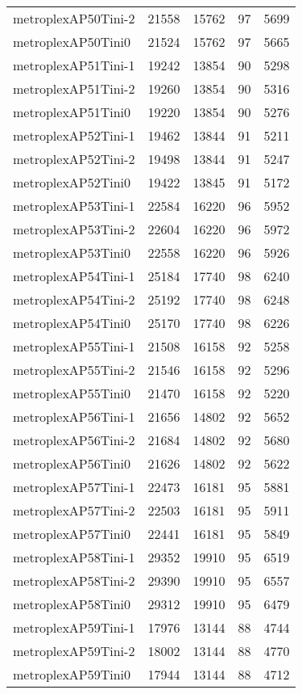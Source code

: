 \begin{longtable}{lrrrr}
metroplexAP50Tini-2 & 21558 & 15762 & 97 & 5699 \\
metroplexAP50Tini0 & 21524 & 15762 & 97 & 5665 \\
metroplexAP51Tini-1 & 19242 & 13854 & 90 & 5298 \\
metroplexAP51Tini-2 & 19260 & 13854 & 90 & 5316 \\
metroplexAP51Tini0 & 19220 & 13854 & 90 & 5276 \\
metroplexAP52Tini-1 & 19462 & 13844 & 91 & 5211 \\
metroplexAP52Tini-2 & 19498 & 13844 & 91 & 5247 \\
metroplexAP52Tini0 & 19422 & 13845 & 91 & 5172 \\
metroplexAP53Tini-1 & 22584 & 16220 & 96 & 5952 \\
metroplexAP53Tini-2 & 22604 & 16220 & 96 & 5972 \\
metroplexAP53Tini0 & 22558 & 16220 & 96 & 5926 \\
metroplexAP54Tini-1 & 25184 & 17740 & 98 & 6240 \\
metroplexAP54Tini-2 & 25192 & 17740 & 98 & 6248 \\
metroplexAP54Tini0 & 25170 & 17740 & 98 & 6226 \\
metroplexAP55Tini-1 & 21508 & 16158 & 92 & 5258 \\
metroplexAP55Tini-2 & 21546 & 16158 & 92 & 5296 \\
metroplexAP55Tini0 & 21470 & 16158 & 92 & 5220 \\
metroplexAP56Tini-1 & 21656 & 14802 & 92 & 5652 \\
metroplexAP56Tini-2 & 21684 & 14802 & 92 & 5680 \\
metroplexAP56Tini0 & 21626 & 14802 & 92 & 5622 \\
metroplexAP57Tini-1 & 22473 & 16181 & 95 & 5881 \\
metroplexAP57Tini-2 & 22503 & 16181 & 95 & 5911 \\
metroplexAP57Tini0 & 22441 & 16181 & 95 & 5849 \\
metroplexAP58Tini-1 & 29352 & 19910 & 95 & 6519 \\
metroplexAP58Tini-2 & 29390 & 19910 & 95 & 6557 \\
metroplexAP58Tini0 & 29312 & 19910 & 95 & 6479 \\
metroplexAP59Tini-1 & 17976 & 13144 & 88 & 4744 \\
metroplexAP59Tini-2 & 18002 & 13144 & 88 & 4770 \\
metroplexAP59Tini0 & 17944 & 13144 & 88 & 4712 \\

\end{longtable}

